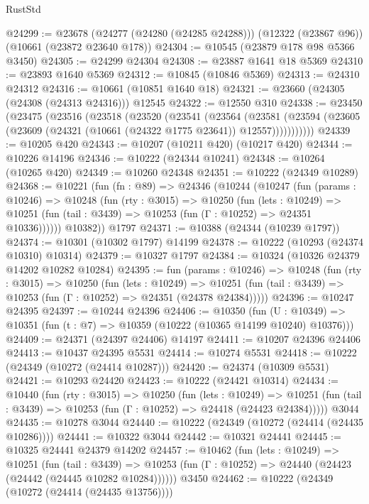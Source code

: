 \begin{lexlean}{RustStd}
\begin{coremodule}
@24299 := @23678
    (@24277 (@24280 (@24285 @24288)))
    (@12322 (@23867 @96))
    (@10661 (@23872 @23640 @178))
@24304 := @10545 (@23879 @178 @98 @5366 @3450)
@24305 := @24299 @24304
@24308 := @23887 @1641 @18 @5369
@24310 := @23893 @1640 @5369
@24312 := @10845 (@10846 @5369)
@24313 := @24310 @24312
@24316 := @10661 (@10851 @1640 @18)
@24321 := @23660 (@24305 (@24308 (@24313 @24316))) @12545
@24322 := @12550 @310
@24338 := @23450
    (@23475
      (@23516
        (@23518
          (@23520
            (@23541
              (@23564
                (@23581
                  (@23594 (@23605 (@23609 (@24321 (@10661 (@24322 @1775 @23641)) @12557)))))))))))
@24339 := @10205 @420
@24343 := @10207 (@10211 @420) (@10217 @420)
@24344 := @10226 @14196
@24346 := @10222 (@24344 @10241)
@24348 := @10264 (@10265 @420)
@24349 := @10260 @24348
@24351 := @10222 (@24349 @10289)
@24368 := @10221
    (fun (fn : @89) =>
    @24346
      (@10244
        (@10247
          (fun (params : @10246) =>
          @10248
            (fun (rty : @3015) =>
            @10250
              (fun (lets : @10249) =>
              @10251 (fun (tail : @3439) => @10253 (fun (Γ : @10252) => @24351 @10336))))))
        @10382))
    @1797
@24371 := @10388 (@24344 (@10239 @1797))
@24374 := @10301 (@10302 @1797) @14199
@24378 := @10222 (@10293 (@24374 @10310) @10314)
@24379 := @10327 @1797
@24384 := @10324 (@10326 @24379 @14202 @10282 @10284)
@24395 := fun (params : @10246) =>
  @10248
    (fun (rty : @3015) =>
    @10250
      (fun (lets : @10249) =>
      @10251 (fun (tail : @3439) => @10253 (fun (Γ : @10252) => @24351 (@24378 @24384)))))
@24396 := @10247 @24395
@24397 := @10244 @24396
@24406 := @10350
    (fun (U : @10349) => @10351 (fun (t : @7) => @10359 (@10222 (@10365 @14199 @10240) @10376)))
@24409 := @24371 (@24397 @24406) @14197
@24411 := @10207 @24396 @24406
@24413 := @10437 @24395 @5531
@24414 := @10274 @5531
@24418 := @10222 (@24349 (@10272 (@24414 @10287)))
@24420 := @24374 (@10309 @5531)
@24421 := @10293 @24420
@24423 := @10222 (@24421 @10314)
@24434 := @10440
    (fun (rty : @3015) =>
    @10250
      (fun (lets : @10249) =>
      @10251 (fun (tail : @3439) => @10253 (fun (Γ : @10252) => @24418 (@24423 @24384)))))
    @3044
@24435 := @10278 @3044
@24440 := @10222 (@24349 (@10272 (@24414 (@24435 @10286))))
@24441 := @10322 @3044
@24442 := @10321 @24441
@24445 := @10325 @24441 @24379 @14202
@24457 := @10462
    (fun (lets : @10249) =>
    @10251
      (fun (tail : @3439) =>
      @10253 (fun (Γ : @10252) => @24440 (@24423 (@24442 (@24445 @10282 @10284))))))
    @3450
@24462 := @10222 (@24349 (@10272 (@24414 (@24435 @13756))))

\end{coremodule}
\end{lexlean}

